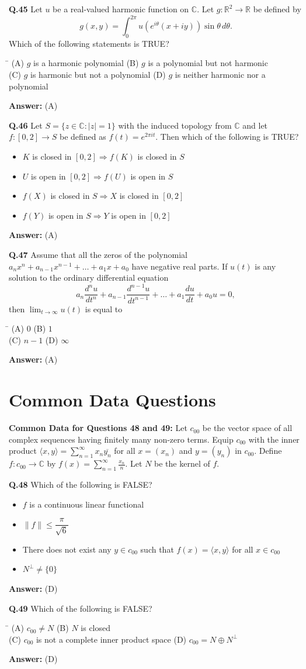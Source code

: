 \documentclass[11pt,a4paper]{article}
\newcommand{\optsfourA}[4]{%
  \begin{tabbing}
    \hspace{0.48\linewidth}\=\kill
    (A) #1 \> (B) #2 \\[2pt]
    (C) #3 \> (D) #4
  \end{tabbing}%
}
\newcommand{\optslistA}[4]{%
  \begin{itemize}
    \setlength{\itemsep}{2pt}\setlength{\parskip}{0pt}
    \item[(A)] #1
    \item[(B)] #2
    \item[(C)] #3
    \item[(D)] #4
  \end{itemize}%
}
\newcommand{\ans}[1]{\textbf{Answer:} #1\par\medskip}
\begin{document}
\textbf{Q.45} Let $u$ be a real-valued harmonic function on $\mathbb{C}$. Let $g : \mathbb{R}^2 \to \mathbb{R}$ be defined by
\[
  g(x, y) = \int_0^{2\pi} u(e^{i\theta}(x + iy))\sin\theta\,d\theta.
\]
Which of the following statements is TRUE?
\optsfourA{$g$ is a harmonic polynomial}{$g$ is a polynomial but not harmonic}{$g$ is harmonic but not a polynomial}{$g$ is neither harmonic nor a polynomial}
\ans{(A)}

\textbf{Q.46} Let $S = \{z \in \mathbb{C} : |z| = 1\}$ with the induced topology from $\mathbb{C}$ and let $f : [0, 2] \to S$ be defined as $f(t) = e^{2\pi i t}$. Then which of the following is TRUE?
\optslistA{$K$ is closed in $[0, 2] \Rightarrow f(K)$ is closed in $S$}{$U$ is open in $[0, 2] \Rightarrow f(U)$ is open in $S$}{$f(X)$ is closed in $S \Rightarrow X$ is closed in $[0, 2]$}{$f(Y)$ is open in $S \Rightarrow Y$ is open in $[0, 2]$}
\ans{(A)}

\textbf{Q.47} Assume that all the zeros of the polynomial $a_n x^n + a_{n-1} x^{n-1} + \dots + a_1 x + a_0$ have negative real parts. If $u(t)$ is any solution to the ordinary differential equation
\[
  a_n \frac{d^n u}{dt^n} + a_{n-1}\frac{d^{n-1} u}{dt^{n-1}} + \dots + a_1 \frac{du}{dt} + a_0 u = 0,
\]
then $\displaystyle\lim_{t\to\infty} u(t)$ is equal to
\optsfourA{$0$}{$1$}{$n - 1$}{$\infty$}
\ans{(A)}

\section*{Common Data Questions}

\textbf{Common Data for Questions 48 and 49:}
Let $c_{00}$ be the vector space of all complex sequences having finitely many non-zero terms. Equip $c_{00}$ with the inner product $\langle x, y \rangle = \displaystyle\sum_{n=1}^{\infty} x_n \overline{y_n}$ for all $x = (x_n)$ and $y = (y_n)$ in $c_{00}$. Define $f : c_{00} \to \mathbb{C}$ by $f(x) = \displaystyle\sum_{n=1}^{\infty} \frac{x_n}{n}$. Let $N$ be the kernel of $f$.

\textbf{Q.48} Which of the following is FALSE?
\optslistA{$f$ is a continuous linear functional}{$\|f\| \le \dfrac{\pi}{\sqrt{6}}$}{There does not exist any $y \in c_{00}$ such that $f(x) = \langle x, y \rangle$ for all $x \in c_{00}$}{$N^\perp \ne \{0\}$}
\ans{(D)}

\textbf{Q.49} Which of the following is FALSE?
\optsfourA{$c_{00} \ne N$}{$N$ is closed}{$c_{00}$ is not a complete inner product space}{$c_{00} = N \oplus N^\perp$}
\ans{(D)}
\end{document}
